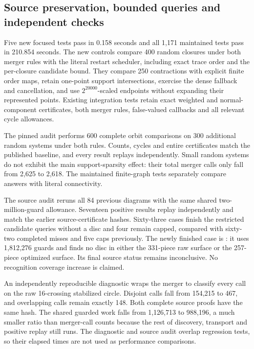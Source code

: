 \subsection{Source preservation, bounded queries and independent checks}

Five new focused tests pass in 0.158 seconds and all 1,171 maintained tests
pass in 210.854 seconds. The new controls compare 400 random closures under
both merger rules with the literal restart scheduler, including exact trace
order and the per-closure candidate bound. They compare 250 contractions
with explicit finite order maps, retain one-point support intersections,
exercise the dense fallback and cancellation, and use $2^{20000}$-scaled
endpoints without expanding their represented points. Existing integration
tests retain exact weighted and normal-component certificates, both merger
rules, false-valued callbacks and all relevant cycle allowances.

The pinned audit performs 600 complete orbit comparisons on 300 additional
random systems under both rules. Counts, cycles and entire certificates
match the published baseline, and every result replays independently.
Small random systems do not exhibit the main support-sparsity effect:
their total merger calls only fall from 2,625 to 2,618. The maintained
finite-graph tests separately compare answers with literal connectivity.

The source audit reruns all 84 previous diagrams with the same shared
two-million-guard allowance. Seventeen positive results replay independently
and match the earlier source-certificate hashes. Sixty-three cases finish
the restricted candidate queries without a disc and four remain capped,
compared with sixty-two completed misses and five caps previously.
The newly finished case is : it uses 1,812,276 guards and
finds no disc in either the 331-piece raw surface or the 257-piece optimized
surface. Its final source status remains inconclusive. No recognition
coverage increase is claimed.

An independently reproducible diagnostic wraps the merger to classify every
call on the raw 16-crossing stabilized circle. Disjoint calls fall from
154,215 to 467, and overlapping calls remain exactly 148. Both complete
source proofs have the same hash. The shared guarded work falls from
1,126,713 to 988,196, a much smaller ratio than merger-call counts because
the rest of discovery, transport and positive replay still runs. The
diagnostic and source audit overlap regression tests, so their elapsed
times are not used as performance comparisons.

